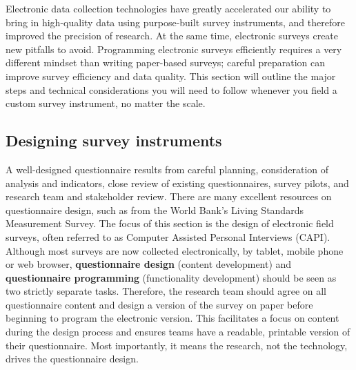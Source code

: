 Electronic data collection technologies
have greatly accelerated our ability to bring in high-quality data
using purpose-built survey instruments,
and therefore improved the precision of research.
At the same time, electronic surveys create new pitfalls to avoid.
Programming electronic surveys efficiently requires a very different mindset
than writing paper-based surveys;
careful preparation can improve survey efficiency and data quality.
This section will outline the major steps and technical considerations
you will need to follow whenever you field a custom survey instrument,
no matter the scale.

\subsection{Designing survey instruments}
A well-designed questionnaire results from careful planning,
consideration of analysis and indicators,
close review of existing questionnaires,
survey pilots, and research team and stakeholder review.
There are many excellent resources on questionnaire design,
such as from the World Bank's Living Standards Measurement Survey.
The focus of this section is the design of electronic field surveys,
often referred to as Computer Assisted Personal Interviews (CAPI).
Although most surveys are now collected electronically, by tablet, mobile phone or web browser,
\textbf{questionnaire design}
(content development) and \textbf{questionnaire programming}
(functionality development) should be seen as two strictly separate tasks.
Therefore, the research team should agree on all questionnaire content
and design a version of the survey on paper
before beginning to program the electronic version.
This facilitates a focus on content during the design process
and ensures teams have a readable, printable version of their questionnaire.
Most importantly, it means the research, not the technology,
drives the questionnaire design.

